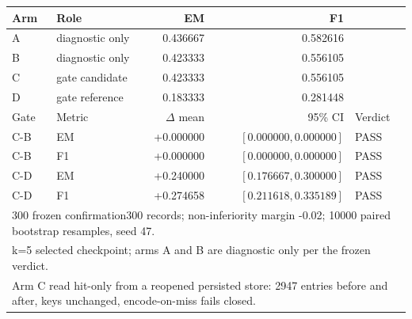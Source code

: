 \begin{tabular}{llrrl}
\toprule
Arm & Role & EM & F1 & \\
\midrule
A & diagnostic only & 0.436667 & 0.582616 \\
B & diagnostic only & 0.423333 & 0.556105 \\
C & gate candidate & 0.423333 & 0.556105 \\
D & gate reference & 0.183333 & 0.281448 \\
\midrule
Gate & Metric & $\Delta$ mean & 95\% CI & Verdict \\
C-B & EM & +0.000000 & $[0.000000, 0.000000]$ & PASS \\
C-B & F1 & +0.000000 & $[0.000000, 0.000000]$ & PASS \\
C-D & EM & +0.240000 & $[0.176667, 0.300000]$ & PASS \\
C-D & F1 & +0.274658 & $[0.211618, 0.335189]$ & PASS \\
\midrule
\multicolumn{5}{l}{300 frozen confirmation300 records; non-inferiority margin -0.02; 10000 paired bootstrap resamples, seed 47.} \\
\multicolumn{5}{l}{k=5 selected checkpoint; arms A and B are diagnostic only per the frozen verdict.} \\
\multicolumn{5}{l}{Arm C read hit-only from a reopened persisted store: 2947 entries before and after, keys unchanged, encode-on-miss fails closed.} \\
\bottomrule
\end{tabular}
